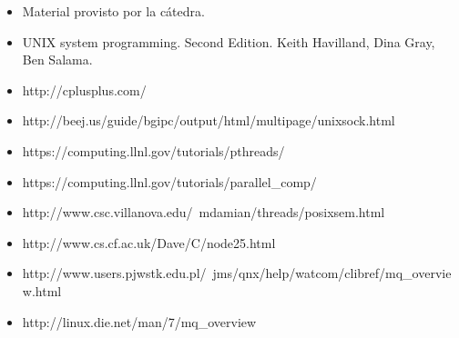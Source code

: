 \documentclass[a4paper,10pt]{article}
\begin{document}
\begin{itemize}
  \item Material provisto por la cátedra.
  \item UNIX system programming. Second Edition. Keith Havilland, Dina Gray, Ben Salama.
  \item http://cplusplus.com/
  \item http://beej.us/guide/bgipc/output/html/multipage/unixsock.html
  \item https://computing.llnl.gov/tutorials/pthreads/
  \item https://computing.llnl.gov/tutorials/parallel\_comp/
  \item http://www.csc.villanova.edu/~mdamian/threads/posixsem.html
  \item http://www.cs.cf.ac.uk/Dave/C/node25.html
  \item http://www.users.pjwstk.edu.pl/~jms/qnx/help/watcom/clibref/mq\_overview.html
  \item http://linux.die.net/man/7/mq\_overview
\end{itemize}
   
\end{document}
